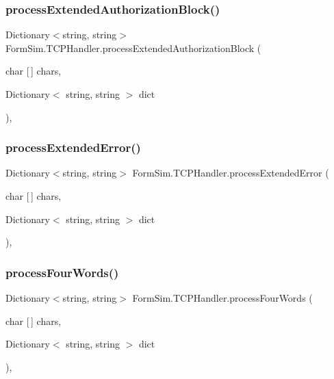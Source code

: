 \subsubsection{\texorpdfstring{process\+Extended\+Authorization\+Block()}{processExtendedAuthorizationBlock()}}
{\footnotesize\ttfamily Dictionary$<$string, string$>$ Form\+Sim.\+T\+C\+P\+Handler.\+process\+Extended\+Authorization\+Block (\begin{DoxyParamCaption}\item[{char \mbox{[}$\,$\mbox{]}}]{chars,  }\item[{Dictionary$<$ string, string $>$}]{dict }\end{DoxyParamCaption})\hspace{0.3cm}{\ttfamily [inline]}, {\ttfamily [private]}}

\mbox{\label{class_form_sim_1_1_t_c_p_handler_aadbaeefbb8bb128261c7cbf85be9c91c}} 
\subsubsection{\texorpdfstring{process\+Extended\+Error()}{processExtendedError()}}
{\footnotesize\ttfamily Dictionary$<$string, string$>$ Form\+Sim.\+T\+C\+P\+Handler.\+process\+Extended\+Error (\begin{DoxyParamCaption}\item[{char \mbox{[}$\,$\mbox{]}}]{chars,  }\item[{Dictionary$<$ string, string $>$}]{dict }\end{DoxyParamCaption})\hspace{0.3cm}{\ttfamily [inline]}, {\ttfamily [private]}}

\mbox{\label{class_form_sim_1_1_t_c_p_handler_a0f25a73a16e6cea8f4fb65eb41ef8373}} 
\subsubsection{\texorpdfstring{process\+Four\+Words()}{processFourWords()}}
{\footnotesize\ttfamily Dictionary$<$string, string$>$ Form\+Sim.\+T\+C\+P\+Handler.\+process\+Four\+Words (\begin{DoxyParamCaption}\item[{char \mbox{[}$\,$\mbox{]}}]{chars,  }\item[{Dictionary$<$ string, string $>$}]{dict }\end{DoxyParamCaption})\hspace{0.3cm}{\ttfamily [inline]}, {\ttfamily [private]}}


